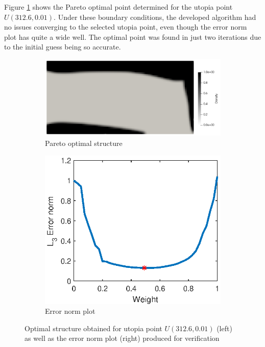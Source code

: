 Figure \ref{fig:test_case_one_pareto_optimum} shows the Pareto optimal point determined for the utopia point $U(312.6,0.01)$. Under these boundary conditions, the developed algorithm had no issues converging to the selected utopia point, even though the error norm plot has quite a wide well. The optimal point was found in just two iterations due to the initial guess being so accurate.
\begin{figure}[ht]
    \centering
    \hfill
    \begin{subfigure}[b]{0.45\linewidth}
        \includegraphics[width=\linewidth]{figures/chapter_6/Case1_ParetoOptimum.png}
        \caption{Pareto optimal structure}
    \end{subfigure}
    \hfill
    \begin{subfigure}[b]{0.25\linewidth}
        \includegraphics[width=\linewidth]{figures/chapter_6/Case1_ErrorNormPlot.eps}
        \caption{Error norm plot}
    \end{subfigure}
    \hfill
    \caption{Optimal structure obtained for utopia point $U(312.6,0.01)$ (left) as well as the error norm plot (right) produced for verification}
    \label{fig:test_case_one_pareto_optimum}
\end{figure}


